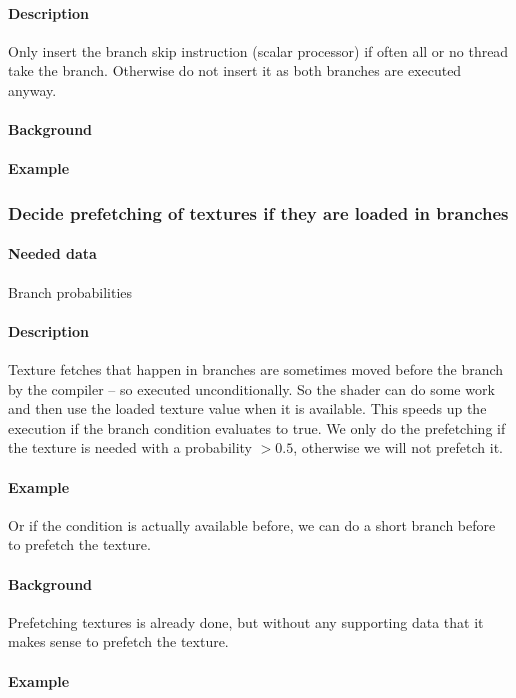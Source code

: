 \paragraph{Description} Only insert the branch skip instruction (scalar processor) if often all or no thread take the branch. Otherwise do not insert it as both branches are executed anyway.
\paragraph{Background}
\paragraph{Example}
	
\subsubsection{Decide prefetching of textures if they are loaded in branches}
\paragraph{Needed data} Branch probabilities
\paragraph{Description} Texture fetches that happen in branches are sometimes moved before the branch by the compiler -- so executed unconditionally. So the shader can do some work and then use the loaded texture value when it is available. This speeds up the execution if the branch condition evaluates to true. We only do the prefetching if the texture is needed with a probability $> 0.5$, otherwise we will not prefetch it.
\paragraph{Example}
	
Or if the condition is actually available before, we can do a short branch before to prefetch the texture.
\paragraph{Background} Prefetching textures is already done, but without any supporting data that it makes sense to prefetch the texture.
\paragraph{Example}
	
